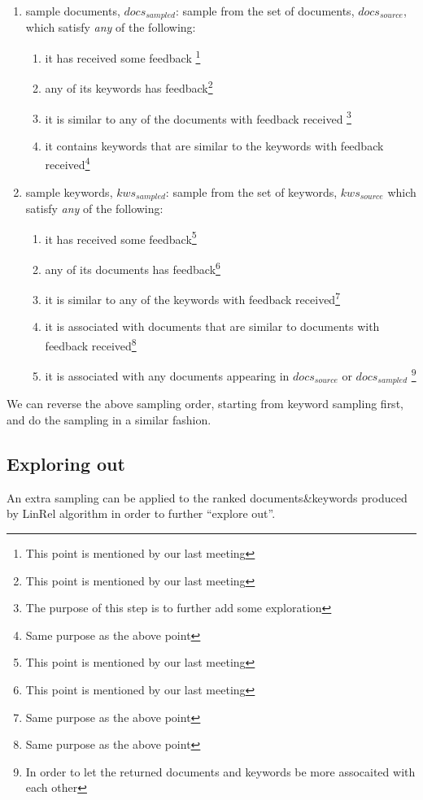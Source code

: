 \documentclass[10pt,a4paper]{article}
\begin{document}
\begin{enumerate}
\item sample documents, $docs_{sampled}$: sample from the set of documents, $docs_{source}$, which satisfy \textit{any} of the following: 
  \begin{enumerate}
  \item it has received some feedback \footnote{This point is mentioned by our last meeting}
  \item any of its keywords has feedback\footnote{This point is mentioned by our last meeting}
  \item it is similar to any of the documents with feedback received \footnote{The purpose of this step is to further add some exploration}
  \item it contains keywords that are similar to the keywords with feedback received\footnote{Same purpose as the above point}
  \end{enumerate}
\item sample keywords, $kws_{sampled}$: sample from the set of keywords, $kws_{source}$ which satisfy \textit{any} of the following: 
  \begin{enumerate}
  \item it has received some feedback\footnote{This point is mentioned by our last meeting}
  \item any of its documents has feedback\footnote{This point is mentioned by our last meeting}
  \item it is similar to any of the keywords with feedback received\footnote{Same purpose as the above point}
  \item it is associated with documents that are similar to documents with feedback received\footnote{Same purpose as the above point}
  \item it is associated with any documents appearing in $docs_{source}$ or $docs_{sampled}$ \footnote{In order to let the returned documents and keywords be more assocaited with each other}
  \end{enumerate}
\end{enumerate}


We can reverse the above sampling order, starting from keyword sampling first, and do the sampling in a similar fashion.

\subsection{Exploring out}
An extra sampling can be applied to the ranked documents\&keywords produced by LinRel algorithm in order to further ``explore out''.
\end{document}
